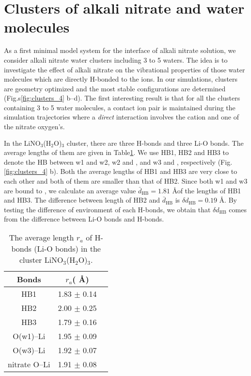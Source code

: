   \section{Clusters of alkali nitrate and water molecules}\label{paragraph_clusters_alkali_nitrate_and_water_molecules}
  As a first minimal model system for the interface of alkali nitrate solution, we consider alkali nitrate water clusters including 3 to 5 waters. 
  The idea is to investigate the effect of alkali nitrate on the vibrational properties of those water molecules which are directly 
  H-bonded to the ions.
  In our simulations, clusters are geometry optimized and the most stable configurations are determined (Fig.s\thinspace\ref{fig:clusters_4} b--d).
  The first interesting result is that for all the clusters containing 3 to 5 water molecules, a contact ion pair is maintained during the 
  simulation trajectories where a \emph{direct} interaction involves the cation and one of the nitrate oxygen's. 

In the LiNO$_3$(H$_2$O)$_3$ cluster, there are three H-bonds and three Li-O bonds. 
The average lengths of them are given in Table\thinspace\ref{tab:table_lino3}. 
We use HB1, HB2 and HB3 to denote the HB between w1 and w2, w2 and \nitrate, and w3 and \nitrate, 
respectively (Fig.\thinspace\ref{fig:clusters_4} b). Both the average lengths of HB1 and HB3 are very close 
to each other and both of them are smaller than that of HB2. 
Since both w1 and w3 are bound to \li, we calculate an average value $\bar{d}_{\text{HB}}=1.81$ \AA of the lengths of HB1 and HB3.
The difference between length of HB2 and $\bar{d}_{\text{HB}}$ is $\delta d_{\text{HB}}=0.19$ \AA.
By testing the difference of environment of each H-bonds,  we obtain that $\delta d_{\text{HB}}$ comes from the 
difference between Li-O bonds and H-bonds.
\begin{table}[htbp]
\centering
\caption{\label{tab:table_lino3}%
  The average length $r_a$ of H-bonds (Li-O bonds) in the cluster LiNO$_3$(H$_2$O)$_3$.}
\begin{tabular}{ccc}
Bonds& $r_a$( \AA) \\ 
\hline
HB1 &1.83 $\pm$ 0.14\\
HB2 &2.00 $\pm$ 0.25 \\
HB3 &1.79 $\pm$ 0.16 \\
O(w1)--Li &1.95 $\pm$ 0.09 \\
O(w3)--Li &1.92 $\pm$ 0.07 \\
nitrate O--Li &1.91 $\pm$ 0.08
\end{tabular}
\end{table}

